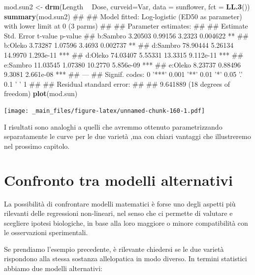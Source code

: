\documentclass[a4paper,12pt,oneside]{book}
\newenvironment{Shaded}{\begin{snugshade}}{\end{snugshade}}
\newcommand{\KeywordTok}[1]{\textcolor[rgb]{0.13,0.29,0.53}{\textbf{#1}}}
\newcommand{\DataTypeTok}[1]{\textcolor[rgb]{0.13,0.29,0.53}{#1}}
\newcommand{\StringTok}[1]{\textcolor[rgb]{0.31,0.60,0.02}{#1}}
\newcommand{\OperatorTok}[1]{\textcolor[rgb]{0.81,0.36,0.00}{\textbf{#1}}}
\newcommand{\NormalTok}[1]{#1}
\theoremstyle{definition}
\theoremstyle{definition}
\theoremstyle{definition}
\theoremstyle{remark}
\begin{document}
\begin{Shaded}
\begin{Highlighting}[]
\NormalTok{mod.sun2 <-}\StringTok{ }\KeywordTok{drm}\NormalTok{(Length }\OperatorTok{~}\StringTok{ }\NormalTok{Dose, }\DataTypeTok{curveid=}\NormalTok{Var, }\DataTypeTok{data =}\NormalTok{ sunflower, }\DataTypeTok{fct =} \KeywordTok{LL.3}\NormalTok{())}
\KeywordTok{summary}\NormalTok{(mod.sun2)}
\NormalTok{## }
\NormalTok{## Model fitted: Log-logistic (ED50 as parameter) with lower limit at 0 (3 parms)}
\NormalTok{## }
\NormalTok{## Parameter estimates:}
\NormalTok{## }
\NormalTok{##           Estimate Std. Error t-value   p-value    }
\NormalTok{## b:Sambro   3.20503    0.99156  3.2323  0.004622 ** }
\NormalTok{## b:Oleko    3.73287    1.07596  3.4693  0.002737 ** }
\NormalTok{## d:Sambro  78.90444    5.26134 14.9970 1.293e-11 ***}
\NormalTok{## d:Oleko   74.03407    5.55331 13.3315 9.112e-11 ***}
\NormalTok{## e:Sambro  11.03545    1.07380 10.2770 5.856e-09 ***}
\NormalTok{## e:Oleko    8.23737    0.88496  9.3081 2.661e-08 ***}
\NormalTok{## ---}
\NormalTok{## Signif. codes:  0 '***' 0.001 '**' 0.01 '*' 0.05 '.' 0.1 ' ' 1}
\NormalTok{## }
\NormalTok{## Residual standard error:}
\NormalTok{## }
\NormalTok{##  9.641889 (18 degrees of freedom)}
\KeywordTok{plot}\NormalTok{(mod.sun)}
\end{Highlighting}
\end{Shaded}

\texttt{[image: \_main\_files/figure-latex/unnamed-chunk-160-1.pdf]}

I risultati sono analoghi a quelli che avremmo ottenuto parametrizzando
separatamente le curve per le due varietà ,ma con chiari vantaggi che
illustreremo nel prossimo capitolo.

\section{Confronto tra modelli
alternativi}\label{confronto-tra-modelli-alternativi}

La possibilità di confrontare modelli matematici è forse uno degli
aspetti più rilevanti delle regressioni non-lineari, nel senso che ci
permette di valutare e scegliere ipotesi biologiche, in base alla loro
maggiore o minore compatibilità con le osservazioni sperimentali.

Se prendiamo l'esempio precedente, è rilevante chiedersi se le due
varietà rispondono alla stessa sostanza allelopatica in modo diverso. In
termini statistici abbiamo due modelli alternativi:
\end{document}
